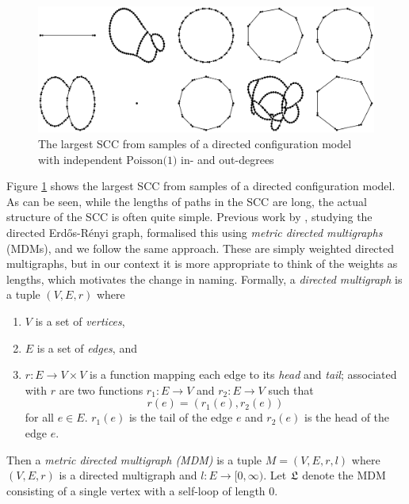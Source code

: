 \begin{figure}[htbp]
    \centering

    \includegraphics[width=\textwidth]{Content/Pictures/Fig3.eps}
    
    \caption{The largest SCC from samples of a directed configuration model with independent $\text{Poisson(1)}$ in- and out-degrees}
    \label{fig:largest-sccs}
\end{figure}

Figure \ref{fig:largest-sccs} shows the largest SCC from samples of a directed configuration model. As can be seen, while the lengths of paths in the SCC are long, the actual structure of the SCC is often quite simple. Previous work by \citet{goldschmidtScalingLimitCritical2021}, studying the directed Erd\H{o}s-R\'{e}nyi graph, formalised this using \emph{metric directed multigraphs} (MDMs), and we follow the same approach. These are simply weighted directed multigraphs, but in our context it is more appropriate to think of the weights as lengths, which motivates the change in naming. Formally, a \emph{directed multigraph} is a tuple $(V, E, r)$ where
\begin{enumerate}
    \item $V$ is a set of \emph{vertices},
    \item $E$ is a set of \emph{edges}, and
    \item $r: E \to V \times V$ is a function mapping each edge to its \emph{head} and \emph{tail}; associated with $r$ are two functions $r_1: E \to V$ and $r_2: E \to V$ such that
\begin{equation*}
    r(e) = (r_1(e), r_2(e))
\end{equation*}
for all $e \in E$. $r_1(e)$ is the tail of the edge $e$ and $r_2(e)$ is the head of the edge $e$.
\end{enumerate}
 Then a \emph{metric directed multigraph (MDM)} is a tuple $M = (V, E, r, l)$ where $(V, E, r)$ is a directed multigraph and $l:E \to [0, \infty)$. Let $\mathfrak L$ denote the MDM consisting of a single vertex with a self-loop of length 0.

